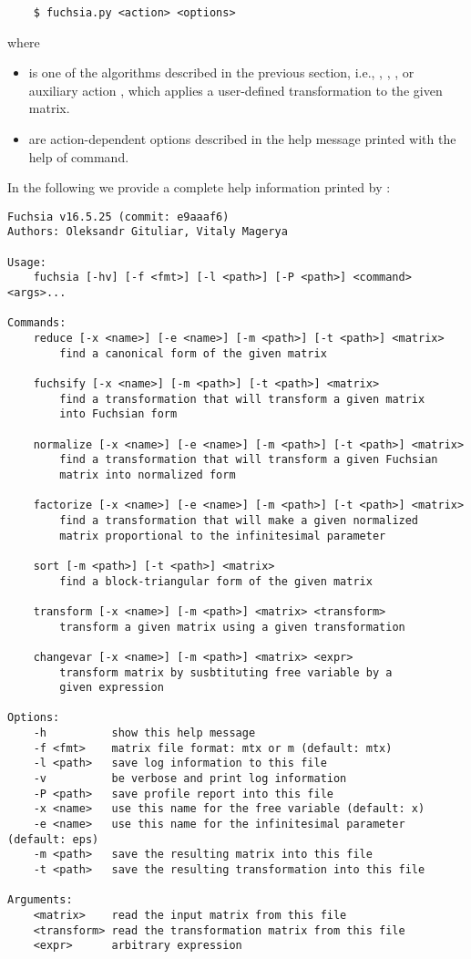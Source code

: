 \documentclass[12pt,a4paper]{article}
\begin{document}
\begin{verbatim}
    $ fuchsia.py <action> <options>
\end{verbatim}

where
\begin{itemize}
  \item {} is one of the algorithms described in the previous section, i.e., , , , or auxiliary action , which applies a user-defined transformation to the given matrix.
  \item {} are action-dependent options described in the help message printed with the help of  command.
\end{itemize}

In the following we provide a complete help information printed by :
{\small
\begin{verbatim}
Fuchsia v16.5.25 (commit: e9aaaf6)
Authors: Oleksandr Gituliar, Vitaly Magerya

Usage:
    fuchsia [-hv] [-f <fmt>] [-l <path>] [-P <path>] <command> <args>...

Commands:
    reduce [-x <name>] [-e <name>] [-m <path>] [-t <path>] <matrix>
        find a canonical form of the given matrix

    fuchsify [-x <name>] [-m <path>] [-t <path>] <matrix>
        find a transformation that will transform a given matrix
        into Fuchsian form

    normalize [-x <name>] [-e <name>] [-m <path>] [-t <path>] <matrix>
        find a transformation that will transform a given Fuchsian
        matrix into normalized form

    factorize [-x <name>] [-e <name>] [-m <path>] [-t <path>] <matrix>
        find a transformation that will make a given normalized
        matrix proportional to the infinitesimal parameter

    sort [-m <path>] [-t <path>] <matrix>
        find a block-triangular form of the given matrix

    transform [-x <name>] [-m <path>] <matrix> <transform>
        transform a given matrix using a given transformation

    changevar [-x <name>] [-m <path>] <matrix> <expr>
        transform matrix by susbtituting free variable by a
        given expression

Options:
    -h          show this help message
    -f <fmt>    matrix file format: mtx or m (default: mtx)
    -l <path>   save log information to this file
    -v          be verbose and print log information
    -P <path>   save profile report into this file
    -x <name>   use this name for the free variable (default: x)
    -e <name>   use this name for the infinitesimal parameter (default: eps)
    -m <path>   save the resulting matrix into this file
    -t <path>   save the resulting transformation into this file

Arguments:
    <matrix>    read the input matrix from this file
    <transform> read the transformation matrix from this file
    <expr>      arbitrary expression
\end{verbatim}}
\end{document}
